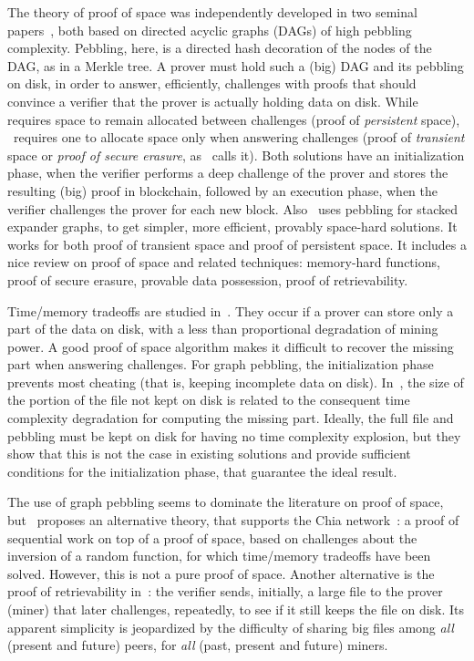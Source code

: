 The theory of proof of space was independently developed
in two seminal papers~\cite{AtenieseBFG14,DziembowskiFKP15},
both based on directed acyclic graphs (DAGs) of high pebbling complexity.
Pebbling, here, is a directed hash decoration of the nodes of the DAG, as in a Merkle tree.
A prover must hold such a (big) DAG and its pebbling on disk, in order to answer, efficiently,
challenges with proofs that should convince a verifier that
the prover is actually holding data on disk.
While~\cite{DziembowskiFKP15} requires space to remain allocated between challenges
(proof of \emph{persistent} space), \cite{AtenieseBFG14}~requires one
to allocate space only when answering challenges
(proof of \emph{transient} space or \emph{proof of secure erasure}, as~\cite{DziembowskiFKP15} calls it).
Both solutions have an initialization phase, when the verifier performs a deep challenge
of the prover and stores the resulting (big) proof in blockchain, followed by an execution phase,
when the verifier challenges the prover for each new block. Also~\cite{RenD16} uses
pebbling for stacked expander graphs, to get simpler, more efficient,
provably space-hard solutions.
It works for both proof of transient space and proof of persistent space.
It includes a nice review on proof of space
and related techniques: memory-hard functions, proof of secure erasure, provable data possession,
proof of retrievability.

Time/memory tradeoffs are studied in~\cite{Reyzin23}. They occur if
a prover can store only a part of the data on disk, with a less than proportional
degradation of mining power.
A good proof of space algorithm makes it difficult to recover the
missing part when answering challenges.
For graph pebbling, the initialization phase prevents most cheating
(that is, keeping incomplete data on disk). In~\cite{Reyzin23}, the size
of the portion of the file not kept on disk is related to the consequent time
complexity degradation for computing the missing part.
Ideally, the full file and pebbling must be kept on disk
for having no time complexity explosion, but they show
that this is not the case in existing solutions and
provide sufficient conditions for the initialization phase, that guarantee the ideal result.

The use of graph pebbling seems to dominate the literature on proof of space,
but~\cite{AbusalahACKPR17} proposes an alternative theory, that supports
the Chia network~\cite{CohenP19,Chia}:
a proof of sequential work on top of a proof of space, based on challenges
about the inversion of a random function, for which time/memory tradeoffs have been solved.
However, this is not a pure proof of space.
Another alternative is the proof of retrievability
in~\cite{JuelsK07}: the verifier sends, initially,
a large file to the prover (miner) that later challenges, repeatedly, to see
if it still keeps the file on disk. Its apparent simplicity
is jeopardized by the difficulty of sharing big files
among \emph{all} (present and future)
peers, for \emph{all} (past, present and future) miners.

